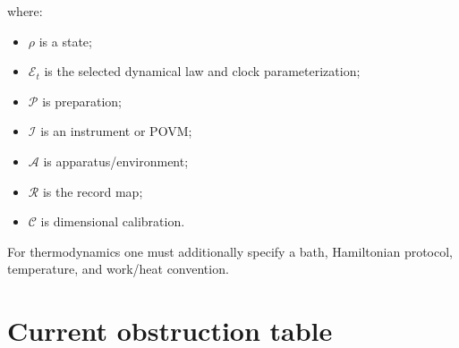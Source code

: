 \documentclass[11pt,a4paper,openany]{report}
\begin{document}
where:

\begin{itemize}
\item 
\(\rho\) is a state;

\item 
\(\mathcal E_t\) is the selected dynamical law and clock parameterization;

\item 
\(\mathcal P\) is preparation;

\item 
\(\mathcal I\) is an instrument or POVM;

\item 
\(\mathcal A\) is apparatus/\allowbreak{}environment;

\item 
\(\mathcal R\) is the record map;

\item 
\(\mathcal C\) is dimensional calibration.

\end{itemize}

For thermodynamics one must additionally specify a bath, Hamiltonian protocol, temperature, and work/\allowbreak{}heat convention.

\section{Current obstruction table}
\end{document}
